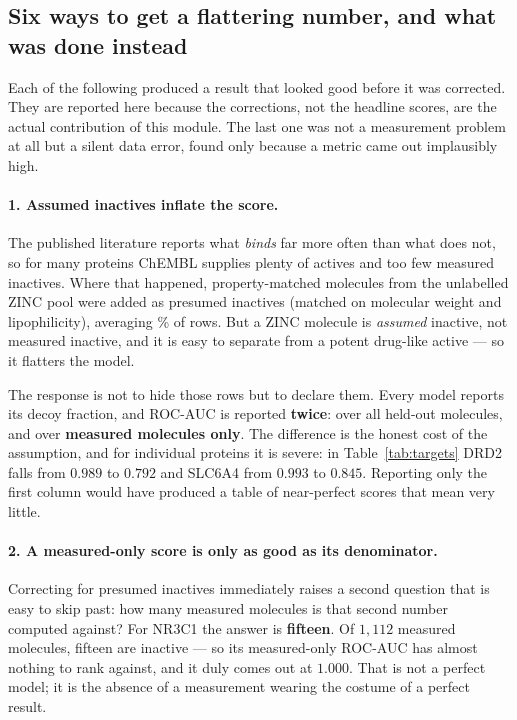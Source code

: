 \subsection{Six ways to get a flattering number, and what was done instead}

Each of the following produced a result that looked good before it was corrected. They are
reported here because the corrections, not the headline scores, are the actual contribution of
this module. The last one was not a measurement problem at all but a silent data error, found
only because a metric came out implausibly high.

\paragraph{1. Assumed inactives inflate the score.} The published literature reports what
\emph{binds} far more often than what does not, so for many proteins ChEMBL supplies plenty of
actives and too few measured inactives. Where that happened, property-matched molecules from the
unlabelled ZINC pool were added as presumed inactives (matched on molecular weight and
lipophilicity), averaging \TgtDecoyFrac\% of rows. But a ZINC molecule is \emph{assumed} inactive,
not measured inactive, and it is easy to separate from a potent drug-like active --- so it
flatters the model.

The response is not to hide those rows but to declare them. Every model reports its decoy
fraction, and ROC-AUC is reported \textbf{twice}: over all held-out molecules, and over
\textbf{measured molecules only}. The difference is the honest cost of the assumption, and for
individual proteins it is severe: in Table~\ref{tab:targets} DRD2 falls from $0.989$ to $0.792$
and SLC6A4 from $0.993$ to $0.845$. Reporting only the first column would have produced a table
of near-perfect scores that mean very little.

\paragraph{2. A measured-only score is only as good as its denominator.} Correcting for presumed
inactives immediately raises a second question that is easy to skip past: how many measured
molecules is that second number computed against? For NR3C1 the answer is \textbf{fifteen}. Of
$1{,}112$ measured molecules, fifteen are inactive --- so its measured-only ROC-AUC has almost
nothing to rank against, and it duly comes out at $1.000$. That is not a perfect model; it is the
absence of a measurement wearing the costume of a perfect result.

